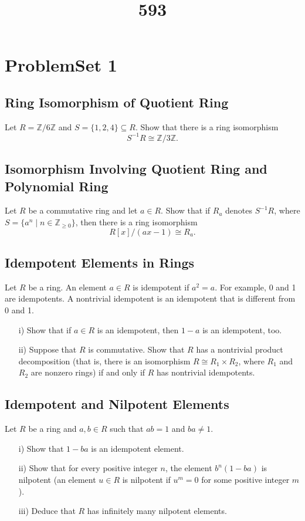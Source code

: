 \documentclass[lang=cn,11pt]{template}
\title{593}
\begin{document}
\frontmatter
\tableofcontents
\mainmatter





\chapter{ProblemSet 1}

\section{Ring Isomorphism of Quotient Ring}
Let \( R = \mathbb{Z}/6\mathbb{Z} \) and \( S = \{1, 2, 4\} \subseteq R \). Show that there is a ring isomorphism
\[
S^{-1}R \cong \mathbb{Z}/3\mathbb{Z}.
\]

\section{Isomorphism Involving Quotient Ring and Polynomial Ring}
Let \( R \) be a commutative ring and let \( a \in R \). Show that if \( R_a \) denotes \( S^{-1}R \), where \( S = \{a^n \mid n \in \mathbb{Z}_{\geq 0}\} \), then there is a ring isomorphism
\[
R[x]/(ax - 1) \cong R_a.
\]

\section{Idempotent Elements in Rings}
Let \( R \) be a ring. An element \( a \in R \) is idempotent if \( a^2 = a \). For example, 0 and 1 are idempotents. A nontrivial idempotent is an idempotent that is different from 0 and 1.
\begin{itemize}
    \item[i)] Show that if \( a \in R \) is an idempotent, then \( 1 - a \) is an idempotent, too.
    \item[ii)] Suppose that \( R \) is commutative. Show that \( R \) has a nontrivial product decomposition (that is, there is an isomorphism \( R \cong R_1 \times R_2 \), where \( R_1 \) and \( R_2 \) are nonzero rings) if and only if \( R \) has nontrivial idempotents.
\end{itemize}

\section{Idempotent and Nilpotent Elements}
Let \( R \) be a ring and \( a, b \in R \) such that \( ab = 1 \) and \( ba \neq 1 \).
\begin{itemize}
    \item[i)] Show that \( 1 - ba \) is an idempotent element.
    \item[ii)] Show that for every positive integer \( n \), the element \( b^n(1 - ba) \) is nilpotent (an element \( u \in R \) is nilpotent if \( u^m = 0 \) for some positive integer \( m \)).
    \item[iii)] Deduce that \( R \) has infinitely many nilpotent elements.
\end{itemize}
\end{document}
